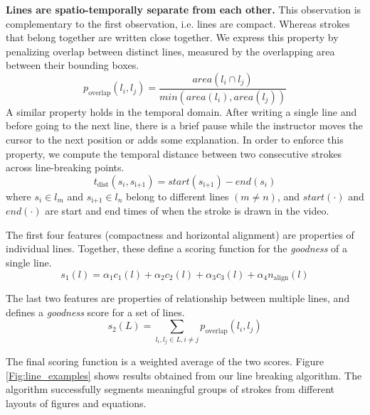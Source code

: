 \textbf{Lines are spatio-temporally separate from each other.} This observation is complementary to the first observation, i.e. lines are compact. Whereas strokes that belong together are written close together. We express this property by penalizing overlap between distinct lines, measured by the overlapping area between their bounding boxes.
\begin{equation}
p_\text{overlap}(l_i, l_j) = \frac{area(l_i\cap l_j)}{min(area(l_i), area(l_j))}
\end{equation}
A similar property holds in the temporal domain. After writing a single line and before going to the next line, there is a brief pause while the instructor moves the cursor to the next position or adds some explanation. In order to enforce this property, we compute the temporal distance between two consecutive strokes across line-breaking points.
\begin{equation}
t_\text{dist}(s_i, s_\text{i+1}) = start(s_\text{i+1}) - end(s_i)
\end{equation}
where $s_i \in l_m$ and $s_\text{i+1} \in l_n$ belong to different lines $(m \neq n)$, and $start(\cdot)$ and $end(\cdot)$ are start and end times of when the stroke is drawn in the video.

The first four features (compactness and horizontal alignment) are properties of individual lines. Together, these define a scoring function for the \textit{goodness} of a single line.
\begin{equation}
s_1(l) = \alpha_1c_1(l) + \alpha_2c_2(l) + \alpha_3c_3(l) + \alpha_4n_\text{align}(l)
\end{equation}

The last two features are properties of relationship between multiple lines, and defines a \textit{goodness} score for a set of lines. 
\begin{equation}
s_2(L) = \sum \limits_{l_i,l_j\in L, i\neq j}p_\text{overlap}(l_i, l_j) 
\end{equation}

The final scoring function is a weighted average of the two scores.
Figure \ref{Fig:line_examples} shows results obtained from our line breaking algorithm. The algorithm successfully segments meaningful groups of strokes from different layouts of figures and equations.


